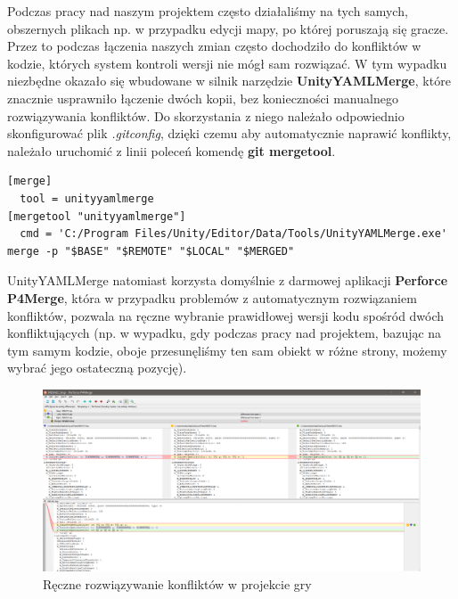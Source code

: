 \documentclass[openright]{xmgr}
\newcommand{\name}[1]{\textbf{\textcolor{NavyBlue}{#1}}}
\begin{document}
    Podczas pracy nad naszym projektem często działaliśmy na tych samych, obszernych plikach np. w przypadku edycji mapy, po której poruszają się gracze. 
    Przez to podczas łączenia naszych zmian często dochodziło do konfliktów w kodzie, których system kontroli wersji nie mógł sam rozwiązać. 
    W tym wypadku niezbędne okazało się wbudowane w silnik narzędzie \name{UnityYAMLMerge}, które znacznie usprawniło łączenie dwóch kopii, bez konieczności manualnego rozwiązywania konfliktów. Do skorzystania z niego należało odpowiednio skonfigurować plik \textit{.gitconfig}, dzięki czemu aby automatycznie naprawić konflikty, należało uruchomić z linii poleceń komendę \name{git mergetool}.

\begin{minipage}{\textwidth}
\begin{lstlisting}[caption={Zawartość pliku .gitconfig po konfiguracji narzędzia UnityYAMLMerge}]
[merge]
  tool = unityyamlmerge
[mergetool "unityyamlmerge"]
  cmd = 'C:/Program Files/Unity/Editor/Data/Tools/UnityYAMLMerge.exe' merge -p "$BASE" "$REMOTE" "$LOCAL" "$MERGED"
\end{lstlisting}
\end{minipage}

    UnityYAMLMerge natomiast korzysta domyślnie z darmowej aplikacji \name{Perforce P4Merge}, która w przypadku problemów z automatycznym rozwiązaniem konfliktów, pozwala na ręczne wybranie prawidłowej wersji kodu spośród dwóch konfliktujących (np. w wypadku, gdy podczas pracy nad projektem, bazując na tym samym kodzie, oboje przesunęliśmy ten sam obiekt w różne strony, możemy wybrać jego ostateczną pozycję).

    \begin{figure}[H]
    \includegraphics[width=\textwidth]{p4merge.png}
    \caption{Ręczne rozwiązywanie konfliktów w projekcie gry}
    \end{figure}
\end{document}
